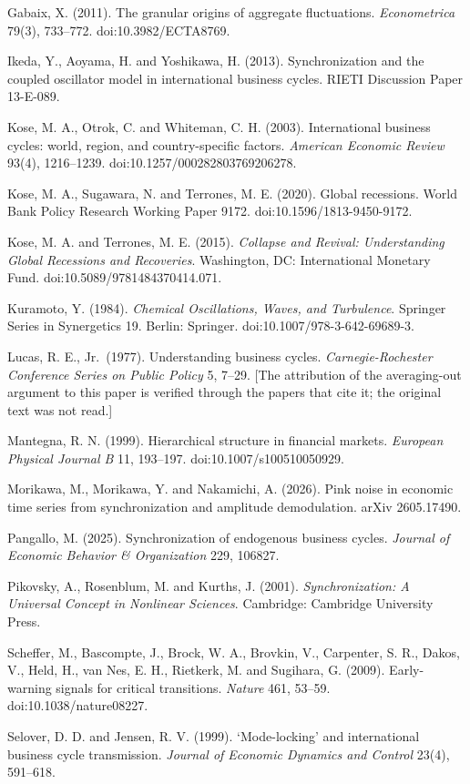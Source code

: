 \documentclass[11pt,a4paper]{article}
\begin{document}
Gabaix, X. (2011). The granular origins of aggregate fluctuations. \emph{Econometrica} 79(3), 733–772. doi:10.3982/ECTA8769.

Ikeda, Y., Aoyama, H. and Yoshikawa, H. (2013). Synchronization and the coupled oscillator model in international business cycles. RIETI Discussion Paper 13-E-089.

Kose, M. A., Otrok, C. and Whiteman, C. H. (2003). International business cycles: world, region, and country-specific factors. \emph{American Economic Review} 93(4), 1216–1239. doi:10.1257/000282803769206278.

Kose, M. A., Sugawara, N. and Terrones, M. E. (2020). Global recessions. World Bank Policy Research Working Paper 9172. doi:10.1596/1813-9450-9172.

Kose, M. A. and Terrones, M. E. (2015). \emph{Collapse and Revival: Understanding Global Recessions and Recoveries}. Washington, DC: International Monetary Fund. doi:10.5089/9781484370414.071.

Kuramoto, Y. (1984). \emph{Chemical Oscillations, Waves, and Turbulence}. Springer Series in Synergetics 19. Berlin: Springer. doi:10.1007/978-3-642-69689-3.

Lucas, R. E., Jr.~(1977). Understanding business cycles. \emph{Carnegie-Rochester Conference Series on Public Policy} 5, 7–29. {[}The attribution of the averaging-out argument to this paper is verified through the papers that cite it; the original text was not read.{]}

Mantegna, R. N. (1999). Hierarchical structure in financial markets. \emph{European Physical Journal B} 11, 193–197. doi:10.1007/s100510050929.

Morikawa, M., Morikawa, Y. and Nakamichi, A. (2026). Pink noise in economic time series from synchronization and amplitude demodulation. arXiv 2605.17490.

Pangallo, M. (2025). Synchronization of endogenous business cycles. \emph{Journal of Economic Behavior \& Organization} 229, 106827.

Pikovsky, A., Rosenblum, M. and Kurths, J. (2001). \emph{Synchronization: A Universal Concept in Nonlinear Sciences}. Cambridge: Cambridge University Press.

Scheffer, M., Bascompte, J., Brock, W. A., Brovkin, V., Carpenter, S. R., Dakos, V., Held, H., van Nes, E. H., Rietkerk, M. and Sugihara, G. (2009). Early-warning signals for critical transitions. \emph{Nature} 461, 53–59. doi:10.1038/nature08227.

Selover, D. D. and Jensen, R. V. (1999). `Mode-locking' and international business cycle transmission. \emph{Journal of Economic Dynamics and Control} 23(4), 591–618.
\end{document}
